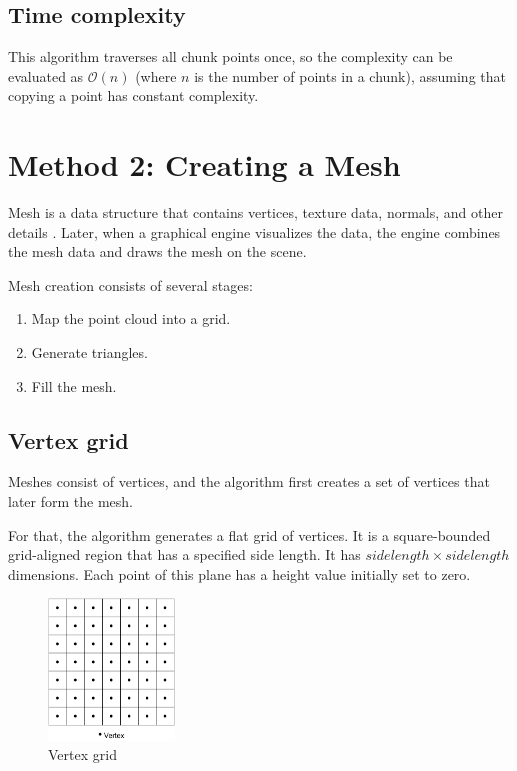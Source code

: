 \subsection{Time complexity}

This algorithm traverses all chunk points once, so the complexity can be evaluated as $\mathcal{O}(n)$ (where $n$ is the number of points in a chunk), assuming that copying a point has constant complexity.


\section{Method 2: Creating a Mesh}
\label{sec:creating_mesh}

Mesh is a data structure that contains vertices, texture data, normals, and other details \cite{UnityScriptingMesh}. Later, when a graphical engine visualizes the data, the engine combines the mesh data and draws the mesh on the scene.

Mesh creation consists of several stages:

\begin{enumerate}
    \item Map the point cloud into a grid.
    \item Generate triangles.
    \item Fill the mesh.
\end{enumerate}


\subsection{Vertex grid}

Meshes consist of vertices, and the algorithm first creates a set of vertices that later form the mesh.

For that, the algorithm generates a flat grid of vertices. It is a square-bounded grid-aligned region that has a specified side length. It has $side length \times side length$ dimensions. Each point of this plane has a height value initially set to zero.

\begin{figure}[ht]
    \centering
    \includegraphics[width=0.3\textwidth]{vertex-grid.pdf}
    \caption{Vertex grid}
    \label{fig:vertex_grid}
\end{figure}


